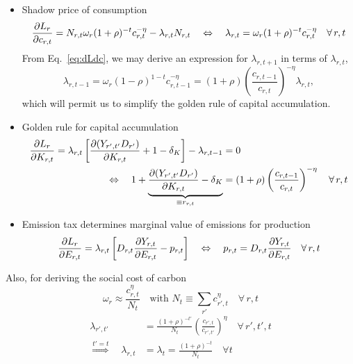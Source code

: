 \documentclass[preprint,3p,authoryear]{elsarticle}
\begin{document}
\begin{itemize}
\item Shadow price of consumption
  \begin{equation}
    \label{eq:dLdc}    \frac{\partial L_r}{\partial c_{r,t}}=N_{r,t}\omega_r(1+\rho)^{-t}c_{r,t}^{-\eta}-\lambda_{r,t}N_{r,t}\quad\Leftrightarrow\quad\lambda_{r,t} = \omega_r(1+\rho)^{-t}c_{r,t}^{-\eta}\quad\forall\,r,t
  \end{equation}
From Eq.~\eqref{eq:dLdc}, we may derive an expression for $\lambda_{r,t+1}$ in terms of $\lambda_{r,t}$,
\begin{equation}
  \label{eq:lambda_tpone} \lambda_{r,t-1}=\omega_r(1-\rho)^{1-t}c_{r,t-1}^{-\eta}=(1+\rho)\left(\frac{c_{r,t-1}}{c_{r,t}}\right)^{-\eta}\lambda_{r,t},
\end{equation}
which will permit us to simplify the golden rule of capital accumulation.
\item Golden rule for capital accumulation
  \begin{align} \frac{\partial L_r}{\partial K_{r,t}}=\lambda_{r,t}\left[\frac{\partial(Y_{r',t'}D_{r'})}{\partial K_{r,t}}+1-\delta_K\right]-\lambda_{r,t-1}&= 0\notag\\
    \Leftrightarrow\quad 1+\underbrace{\frac{\partial(Y_{r',t'}D_{r'})}{\partial K_{r,t}}-\delta_K}_{\equiv r_{r,t}} &= (1+\rho)\left(\frac{c_{r,t-1}}{c_{r,t}}\right)^{-\eta}\quad\forall\, r,t \label{eq:dLdK}
  \end{align}
\item Emission tax determines marginal value of emissions for production  
  \begin{equation}
    \label{eq:dLdE} \frac{\partial L_r}{\partial E_{r,t}}=\lambda_{r,t}\left[D_{r,t}\frac{\partial Y_{r,t}}{\partial E_{r,t}}-p_{r,t}\right]\quad\Leftrightarrow\quad p_{r,t}=D_{r,t}\frac{\partial Y_{r,t}}{\partial E_{r,t}} \quad\forall\,r,t 
  \end{equation}
\end{itemize}
Also, for deriving the social cost of carbon 
\begin{equation}
  \label{eq:Negishi}
  \omega_{r}\approx \frac{c_{r,t}^{\eta}}{N_{t}}\quad\text{with }N_t\equiv\sum_{r'}c_{r',t}^{\eta} \quad\forall\,r,t
\end{equation}
\begin{subequations}
  \label{eq:lambda}
\begin{align} \lambda_{r',t'}&=\frac{(1+\rho)^{-t'}}{N_t}\left(\frac{c_{r',t}}{c_{r',t'}}\right)^{\eta}\quad\forall\, r',t',t\label{subeq:delta_rptp}\\
  \overset{t'=t}{\Rightarrow}\quad
  \lambda_{r,t}&=\lambda_{t}=\frac{(1+\rho)^{-t}}{N_t}\quad \forall t\label{subeq:delta_rt}
\end{align}
\end{subequations}
\end{document}
